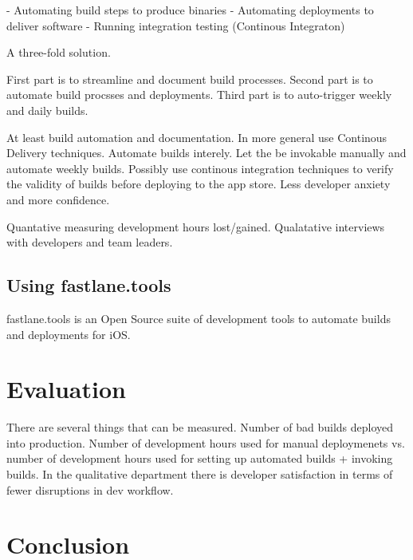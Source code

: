 \documentclass{ituthesis}
\begin{document}
- Automating build steps to produce binaries
- Automating deployments to deliver software
- Running integration testing (Continous Integraton)

A three-fold solution.

First part is to streamline and document build processes.
Second part is to automate build procsses and deployments.
Third part is to auto-trigger weekly and daily builds.



At least build automation and documentation. In more general use Continous Delivery techniques. Automate builds interely. Let the be invokable manually and automate weekly builds. Possibly use continous integration techniques to verify the validity of builds before deploying to the app store. Less developer anxiety and more confidence.

Quantative measuring development hours lost/gained. Qualatative interviews with developers and team leaders.

\section{Using fastlane.tools}

fastlane.tools is an Open Source suite of development tools to automate builds and deployments for iOS. \cite{Krause2015}

\chapter{Evaluation}

There are several things that can be measured. Number of bad builds deployed into production. Number of development hours used for manual deploymenets vs. number of development hours used for setting up automated builds + invoking builds. In the qualitative department there is developer satisfaction in terms of fewer disruptions in dev workflow. 

\chapter{Conclusion}

\clearpage

\renewcommand{\bibname}{References}

\end{document}
